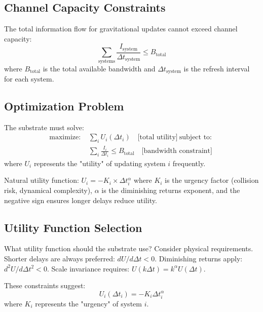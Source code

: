 \documentclass[twocolumn,prd,amsmath,amssymb,aps,superscriptaddress,nofootinbib]{revtex4-2}
\begin{document}
\subsection{Channel Capacity Constraints}

The total information flow for gravitational updates cannot exceed channel capacity:
\begin{equation}
\sum_{\text{systems}} \frac{I_{\text{system}}}{\Delta t_{\text{system}}} \leq B_{\text{total}}
\end{equation}
where $B_{\text{total}}$ is the total available bandwidth and $\Delta t_{\text{system}}$ is the refresh interval for each system.

\subsection{Optimization Problem}

The substrate must solve:
\begin{align}
\text{maximize: } & \sum_i U_i(\Delta t_i) \quad \text{[total utility]} \
\text{subject to: }\\ & \sum_i \frac{I_i}{\Delta t_i} \leq B_{\text{total}} \quad \text{[bandwidth constraint]}
\end{align}
where $U_i$ represents the "utility" of updating system $i$ frequently.

Natural utility function: $U_i = -K_i \times \Delta t_i^\alpha$ where $K_i$ is the urgency factor (collision risk, dynamical complexity), $\alpha$ is the diminishing returns exponent, and the negative sign ensures longer delays reduce utility.

\subsection{Utility Function Selection}

What utility function should the substrate use? Consider physical requirements. Shorter delays are always preferred: $dU/d\Delta t < 0$. Diminishing returns apply: $d^2U/d\Delta t^2 < 0$. Scale invariance requires: $U(k\Delta t) = k^\alpha U(\Delta t)$.

These constraints suggest:
\begin{equation}
U_i(\Delta t_i) = -K_i \Delta t_i^\alpha
\end{equation}
where $K_i$ represents the "urgency" of system $i$.
\end{document}
